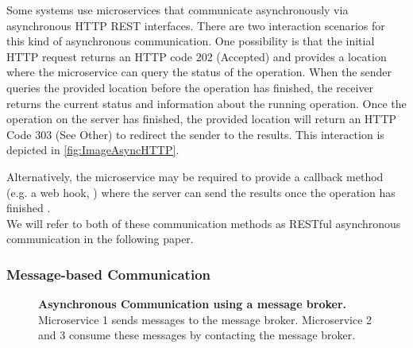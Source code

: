Some systems use microservices that communicate asynchronously via asynchronous HTTP REST interfaces.
There are two interaction scenarios for this kind of asynchronous communication.
One possibility is that the initial HTTP request returns an HTTP code 202 (Accepted) and provides a location where the microservice can query the status of the operation.
When the sender queries the provided location before the operation has finished, the receiver returns the current status and information about the running operation.
Once the operation on the server has finished, the provided location will return an HTTP Code 303 (See Other) to redirect the sender to the results. \cite{Mayer2018}
This interaction is depicted in \autoref{fig:ImageAsyncHTTP}.

Alternatively, the microservice may be required to provide a callback method (e.g. a web hook, \cite{Webhooks}) where the server can send the results once the operation has finished \cite{Mayer2018}. \\

We will refer to both of these communication methods as RESTful asynchronous communication in the following paper.


\subsubsection{Message-based Communication}
\label{sec:Foundation:AsyncCommunication:MBC}

\begin{figure}
\centering
{}
\caption{\textbf{Asynchronous Communication using a message broker.} \\
Microservice 1 sends messages to the message broker. Microservice 2 and 3 consume these messages by contacting the message broker.}
\label{fig:ImageAsyncMBC}
\end{figure}

